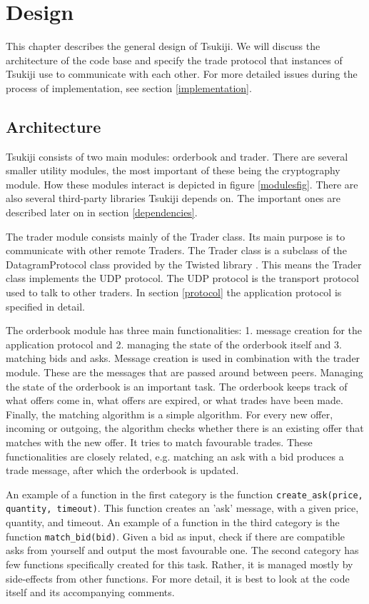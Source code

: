 \section{Design}
This chapter describes the general design of Tsukiji.
We will discuss the architecture of the code base and specify the trade protocol that instances of Tsukiji use to communicate with each other.
For more detailed issues during the process of implementation, see section \ref{implementation}.

\subsection{Architecture}
Tsukiji consists of two main modules: orderbook and trader.
There are several smaller utility modules, the most important of these being the cryptography module.
How these modules interact is depicted in figure \ref{modulesfig}.
There are also several third-party libraries Tsukiji depends on.
The important ones are described later on in section \ref{dependencies}.

The trader module consists mainly of the Trader class.
Its main purpose is to communicate with other remote Traders.
The Trader class is a subclass of the DatagramProtocol class provided by the Twisted library \cite{twisted}.
This means the Trader class implements the UDP protocol.
The UDP protocol is the transport protocol used to talk to other traders.
In section \ref{protocol} the application protocol is specified in detail.

The orderbook module has three main functionalities: 1. message creation for the application protocol and 2. managing the state of the orderbook itself and 3. matching bids and asks.
Message creation is used in combination with the trader module.
These are the messages that are passed around between peers.
Managing the state of the orderbook is an important task.
The orderbook keeps track of what offers come in, what offers are expired, or what trades have been made.
Finally, the matching algorithm is a simple algorithm.
For every new offer, incoming or outgoing, the algorithm checks whether there is an existing offer that matches with the new offer.
It tries to match favourable trades.
These functionalities are closely related, e.g. matching an ask with a bid produces a trade message, after which the orderbook is updated.

An example of a function in the first category is the function \texttt{create\_ask(price, quantity, timeout)}.
This function creates an 'ask' message, with a given price, quantity, and timeout.
An example of a function in the third category is the function \texttt{match\_bid(bid)}.
Given a bid as input, check if there are compatible asks from yourself and output the most favourable one.
The second category has few functions specifically created for this task.
Rather, it is managed mostly by side-effects from other functions.
For more detail, it is best to look at the code itself and its accompanying comments.

